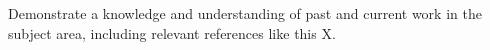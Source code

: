 Demonstrate a knowledge and understanding of past and current work in the subject area, including relevant references like this X.

